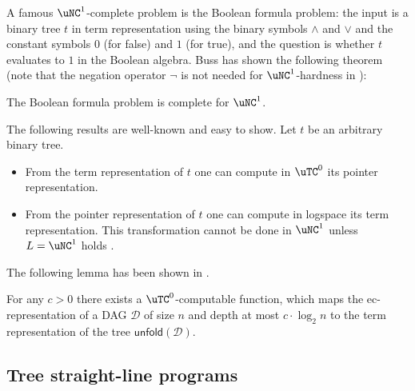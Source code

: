 \documentclass[a4paper,UKenglish,cleveref, autoref, thm-restate, numberwithinsect]{lipics-v2021}
\newcommand{\unfold}{\mathsf{unfold}}
\newcommand{\LS}{\mathsf{L}}
\begin{document}
A famous $\uNC^1$-complete problem is the Boolean formula problem: the input is a binary tree $t$ in term representation using the binary symbols
$\wedge$ and $\vee$ and the constant symbols $0$ (for false) and $1$ (for true), and the question is whether $t$ evaluates to $1$ in the 
Boolean algebra. Buss has shown the following theorem (note that the negation operator $\neg$ is not needed for $\uNC^1$-hardness 
in \cite{Bus87}):

\begin{theorem} \label{thm buss}
The Boolean formula problem is complete for $\uNC^1$.
\end{theorem}
The following results are well-known and easy to show. Let $t$  be an arbitrary binary tree. 
\begin{itemize}
\item From the term representation of $t$ one can compute in $\uTC^0$ its pointer representation.
\item From the pointer representation of $t$ one can compute in logspace its term representation.
This transformation cannot be done in $\uNC^1$ unless $\LS = \uNC^1$ holds \cite{BeaudryM95}. 
\end{itemize}
The following lemma has been shown in \cite{GanardiL19}.

\begin{lemma}  \label{lemma-unfold}
For any $c > 0$ there exists a $\uTC^0$-computable function, which maps the ec-representation of a DAG $\mathcal{D}$ of size $n$
and depth at most $c \cdot \log_2 n$ to the term representation of the tree $\unfold(\mathcal{D})$.
\end{lemma}



\subsection{Tree straight-line programs} 
\label{sec-tslps}
\end{document}
